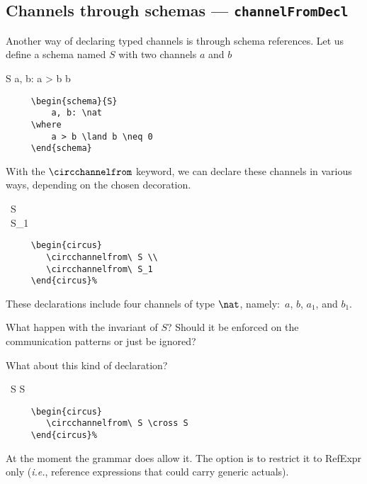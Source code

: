 \documentclass{article}
\newcommand{\grammar}[1]{\texttt{#1}}
\newcommand{\code}[1]{\textsf{#1}}
\begin{document}
\subsection{Channels through schemas --- \grammar{channelFromDecl}}

Another way of declaring typed channels is through schema references. Let us
define a schema named $S$ with two channels $a$ and $b$
%
\begin{schema}{S}
   a, b: \nat
\where
   a > b \land b 
\end{schema}
%
\begin{verbatim}
     \begin{schema}{S}
         a, b: \nat
     \where
         a > b \land b \neq 0
     \end{schema}
\end{verbatim}
%
With the $\circchannelfrom$ keyword, we can declare these channels in various
ways, depending on the chosen decoration.
%
\begin{circus}
   \circchannelfrom\ S \\
   \circchannelfrom\ S_1
\end{circus}%
%
\begin{verbatim}
     \begin{circus}
        \circchannelfrom\ S \\
        \circchannelfrom\ S_1
     \end{circus}%
\end{verbatim}
%
These declarations include four channels of type $\nat$, namely:~$a$, $b$,
$a_1$, and $b_1$.

\begin{issue}
What happen with the invariant of $S$? Should it be enforced on the communication patterns or just be ignored?
\end{issue}

\begin{issue}
What about this kind of declaration?
%
\begin{circus}
   \circchannelfrom\ S \cross S
\end{circus}%
%
\begin{verbatim}
     \begin{circus}
        \circchannelfrom\ S \cross S
     \end{circus}%
\end{verbatim}
%
At the moment the grammar does allow it. The option is to restrict it to
\code{RefExpr} only (\textit{i.e.}, reference expressions that could carry
generic actuals).
\end{issue}
\end{document}
